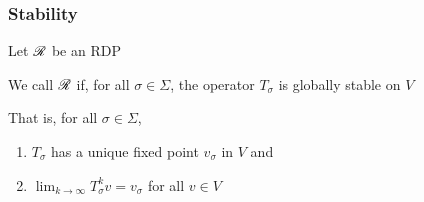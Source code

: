 \documentclass[dvipsnames]{beamer}
\begin{document}
\begin{frame}
    \frametitle{Stability}

    Let $\mathscr R$ be an RDP
    
    \vspace{0.5em}
    \vspace{0.5em}
    \vspace{0.5em}
    We call $\mathscr R$  if, for all $\sigma \in \Sigma$,
    the operator $T_\sigma$ is globally stable on $V$

    \vspace{0.5em}
    \vspace{0.5em}
    \vspace{0.5em}
    \vspace{0.5em}

    That is, for all $\sigma \in \Sigma$,
    \begin{enumerate}
        \item $T_\sigma$ has a unique fixed point $v_\sigma$ in $V$ and
        \vspace{0.5em}
        \vspace{0.5em}
        \item $\lim_{k \to \infty} T_\sigma^k v = v_\sigma$ for all $v \in V$
    \end{enumerate}


\end{frame}
\end{document}
